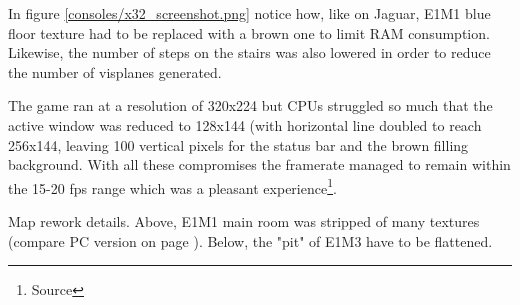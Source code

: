 In figure \ref{consoles/x32_screenshot.png} notice how, like on Jaguar, E1M1 blue floor texture had to be replaced with a brown one to limit RAM consumption. Likewise, the number of steps on the stairs was also lowered in order to reduce the number of visplanes generated.\\
\par
The game ran at a resolution of 320x224 but CPUs struggled so much that the active window was reduced to 128x144 (with horizontal line doubled to reach 256x144, leaving 100 vertical pixels for the status bar and the brown filling background. With all these compromises the framerate managed to remain within the 15-20 fps range which was a pleasant experience\footnote{Source}.\\
\par
{}



\par
Map rework details. Above, E1M1 main room was stripped of many textures (compare PC version on page \pageref{complex_scene_plain_light.png}). Below, the "pit" of E1M3 have to be flattened.\\
\par
{}






